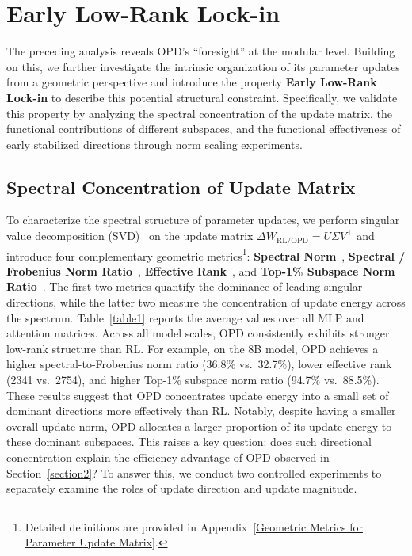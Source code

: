 \documentclass{llmxive}
\begin{document}
\section{Early Low-Rank Lock-in}
\label{section3}

The preceding analysis reveals OPD's ``foresight'' at the modular level. Building on this, we further investigate the intrinsic organization of its parameter updates from a geometric perspective and introduce the property \textbf{Early Low-Rank Lock-in} to describe this potential structural constraint. Specifically, we validate this property by analyzing the spectral concentration of the update matrix, the functional contributions of different subspaces, and the functional effectiveness of early stabilized directions through norm scaling experiments.

\subsection{Spectral Concentration of Update Matrix}
\label{Spectral Concentration of Update Matrix}
To characterize the spectral structure of parameter updates, we perform singular value decomposition (SVD)~\citep{5197422} on the update matrix $\Delta W_{\mathrm{RL/OPD}} = U\Sigma V^\top$ and introduce four complementary geometric metrics\footnote{Detailed definitions are provided in Appendix~\ref{Geometric Metrics for Parameter Update Matrix}.}: \textbf{Spectral Norm}~\citep{MATHIAS1990269}, \textbf{Spectral / Frobenius Norm Ratio}~\citep{ALNATOOR2024e30056}, \textbf{Effective Rank}~\citep{item_f3c74b8f1cad43ed869604b318d58703}, and \textbf{Top-1\% Subspace Norm Ratio}~\citep{cai2025predictability}. The first two metrics quantify the dominance of leading singular directions, while the latter two measure the concentration of update energy across the spectrum. Table~\ref{table1} reports the average values over all MLP and attention matrices. Across all model scales, OPD consistently exhibits stronger low-rank structure than RL. For example, on the 8B model, OPD achieves a higher spectral-to-Frobenius norm ratio (36.8\% vs.\ 32.7\%), lower effective rank (2341 vs.\ 2754), and higher Top-1\% subspace norm ratio (94.7\% vs.\ 88.5\%). These results suggest that OPD concentrates update energy into a small set of dominant directions more effectively than RL. Notably, despite having a smaller overall update norm, OPD allocates a larger proportion of its update energy to these dominant subspaces. This raises a key question: does such directional concentration explain the efficiency advantage of OPD observed in Section~\ref{section2}? To answer this, we conduct two controlled experiments to separately examine the roles of update direction and update magnitude.
\end{document}
